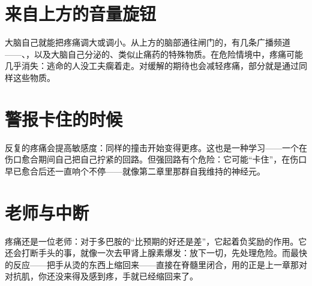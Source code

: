 \section*{来自上方的音量旋钮}

大脑自己就能把疼痛调大或调小。从上方的脑部通往闸门的，有几条广播频道——、，以及大脑自己分泌的、类似止痛药的特殊物质。在危险情境中，疼痛可能几乎消失：逃命的人没工夫瘸着走。对缓解的期待也会减轻疼痛，部分就是通过同样这些物质。

\section*{警报卡住的时候}

反复的疼痛会提高敏感度：同样的撞击开始变得更疼。这也是一种学习——一个在伤口愈合期间自己把自己拧紧的回路。但强回路有个危险：它可能“卡住”，在伤口早已愈合后还一直响个不停——就像第二章里那群自我维持的神经元。

\section*{老师与中断}

疼痛还是一位老师：对于多巴胺的“比预期的好还是差”，它起着负奖励的作用。它还会打断手头的事，就像一次去甲肾上腺素爆发：放下一切，先处理危险。而最快的反应——把手从烫的东西上缩回来——直接在脊髓里闭合，用的正是上一章那对对抗肌，你还没来得及感到疼，手就已经缩回来了。

